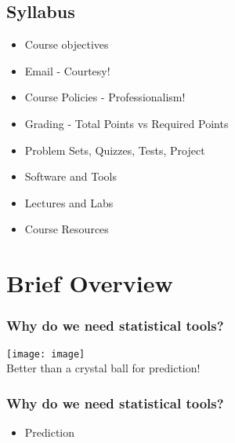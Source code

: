 \documentclass{beamer}
\begin{document}
\subsection{Syllabus} %

\begin{frame}
\begin{itemize}
\item Course objectives
\item Email - Courtesy!
\item Course Policies - Professionalism!
\item Grading - Total Points vs Required Points
\item Problem Sets, Quizzes, Tests, Project
\item Software and Tools
\item Lectures and Labs
\item Course Resources
\end{itemize}
\end{frame}


\section{Brief Overview} %



\begin{frame}
\frametitle{Why do we need statistical tools?}
\centering
\texttt{[image: image]}\\

{\large Better than a crystal ball for prediction!}



\end{frame}

\begin{frame}
\frametitle{Why do we need statistical tools?}
\begin{itemize}
\item Prediction
\end{itemize}
\end{frame}
\end{document}
